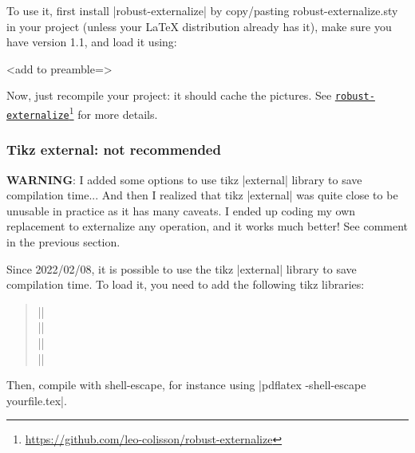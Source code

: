 \documentclass[a4paper,doc2]{ltxdoc} %
\newcommand{\mylink}[2]{\href{#1}{#2}\footnote{\url{#1}}}
\begin{document}
{To use it, first install |robust-externalize| by copy/pasting robust-externalize.sty in your project (unless your \LaTeX{} distribution already has it), make sure you have version 1.1, and load it using:
\begin{codeexample}
\usepackage{robust-externalize}


\begin{ZX}<add to preamble={\def\name{Alice}}>
  \zxX{\text{\name}}
\end{ZX}
\end{codeexample}

Now, just recompile your project: it should cache the pictures. See \mylink{https://github.com/leo-colisson/robust-externalize}{\texttt{robust-externalize}} for more details.

\subsubsection{Tikz external: not recommended}

\textbf{WARNING}: I added some options to use tikz |external| library to save compilation time... And then I realized that tikz |external| was quite close to be unusable in practice as it has many caveats. I ended up coding my own replacement to externalize any operation, and it works much better! See comment in the previous section.

Since 2022/02/08, it is possible to use the tikz |external| library to save compilation time. To load it, you need to add the following tikz libraries:
\begin{verse}
  |\usetikzlibrary{external}|\\
  |\usetikzlibrary{zx-calculus}|\\
  |\tikzexternalize|\\
  |\zxConfigureExternalSystemCallAuto|\\
\end{verse}
Then, compile with shell-escape, for instance using |pdflatex -shell-escape yourfile.tex|.

}
\end{document}

